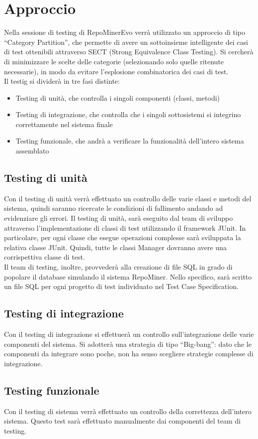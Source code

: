 \chapter{Approccio}
Nella sessione di testing di RepoMinerEvo verrà utilizzato un approccio di tipo ``Category Partition'', che permette di avere un sottoinsieme intelligente dei casi di test ottenibili attraverso SECT (Strong Equivalence Class Testing). Si cercherà di minimizzare le scelte delle categorie (selezionando solo quelle ritenute necessarie), in modo da evitare l'esplosione combinatorica dei casi di test.\\
Il testig si dividerà in tre fasi distinte:\\
\begin{itemize}
\item Testing di unità, che controlla i singoli componenti (classi, metodi)\\
\item Testing di integrazione, che controlla che i singoli sottosistemi si integrino correttamente nel sistema finale\\
\item Testing funzionale, che andrà a verificare la funzionalità dell’intero sistema assemblato\\
\end{itemize}
\section{Testing di unità}
Con il testing di unità verrà effettuato un controllo delle varie classi e metodi del sistema, quindi saranno ricercate le condizioni di fallimento andando ad evidenziare gli errori. Il testing di unità, sarà eseguito dal team di sviluppo attraverso l’implementazione di classi di test utilizzando il framework JUnit. In particolare, per ogni classe che esegue operazioni complesse sarà sviluppata la relativa classe JUnit. Quindi, tutte le classi Manager dovranno avere una corrispettiva classe di test.\\
Il team di testing, inoltre, provvederà alla creazione di file SQL in grado di popolare il database simulando il sistema RepoMiner. Nello specifico, sarà scritto un file SQL per ogni progetto di test individuato nel Test Case Specification.

\section{Testing di integrazione}
Con il testing di integrazione si effettuerà un controllo sull’integrazione delle varie componenti del sistema. Si adotterà una strategia di tipo ``Big-bang'': dato che le componenti da integrare sono poche, non ha senso scegliere strategie complesse di integrazione.\\

\section{Testing funzionale}
Con il testing di sistema verrà effettuato un controllo della correttezza dell’intero sistema. Questo test sarà effettuato manualmente dai componenti del team di testing.